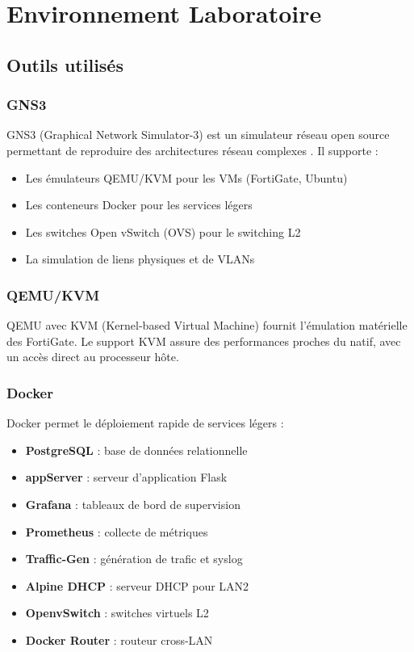 \chapter{Environnement Laboratoire}
\label{chap:labo}

\section{Outils utilisés}

\subsection{GNS3}

GNS3 (Graphical Network Simulator-3) est un simulateur réseau open source permettant de reproduire des architectures réseau complexes \cite{6}. Il supporte :
\begin{itemize}
    \item Les émulateurs QEMU/KVM pour les VMs (FortiGate, Ubuntu)
    \item Les conteneurs Docker pour les services légers
    \item Les switches Open vSwitch (OVS) pour le switching L2
    \item La simulation de liens physiques et de VLANs
\end{itemize}

\subsection{QEMU/KVM}

QEMU avec KVM (Kernel-based Virtual Machine) fournit l'émulation matérielle des FortiGate. Le support KVM assure des performances proches du natif, avec un accès direct au processeur hôte.

\subsection{Docker}

Docker permet le déploiement rapide de services légers :
\begin{itemize}
    \item \textbf{PostgreSQL} : base de données relationnelle
    \item \textbf{appServer} : serveur d'application Flask
    \item \textbf{Grafana} : tableaux de bord de supervision
    \item \textbf{Prometheus} : collecte de métriques
    \item \textbf{Traffic-Gen} : génération de trafic et syslog
    \item \textbf{Alpine DHCP} : serveur DHCP pour LAN2
    \item \textbf{OpenvSwitch} : switches virtuels L2
    \item \textbf{Docker Router} : routeur cross-LAN
\end{itemize}

